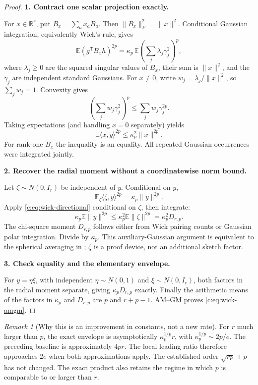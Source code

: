 \documentclass[11pt]{article}
\numberwithin{equation}{section}
\theoremstyle{definition}\newtheorem{definition}[theorem]{Definition}
\theoremstyle{remark}\newtheorem{remark}[theorem]{Remark}
\newcommand{\R}{\mathbb R}\newcommand{\E}{\mathbb E}\newcommand{\Prob}{\mathbb P}
\newcommand{\norm}[1]{\lVert#1\rVert}\newcommand{\ip}[2]{\langle#1,#2\rangle}
\newcommand{\step}[1]{\par\addvspace{.65\baselineskip}\Needspace{4\baselineskip}\noindent\textbf{#1}\par\nobreak\smallskip}
\begin{document}
\begin{proof}
\step{1. Contract one scalar projection exactly.}
For $x\in\R^r$, put $B_x=\sum_a x_a B_a$. Then $\norm{B_x}_F^2=\norm x^2$. Conditional Gaussian integration, equivalently Wick's rule, gives
\[
 \E(g^{\mathsf T}B_xh)^{2p}
 =\kappa_p\,\E\left(\sum_j\lambda_j\gamma_j^2\right)^p,
\]
where $\lambda_j\ge0$ are the squared singular values of $B_x$, their sum is $\norm x^2$, and the $\gamma_j$ are independent standard Gaussians. For $x\ne0$, write $w_j=\lambda_j/\norm x^2$, so $\sum_jw_j=1$.
Convexity gives
\[
 \left(\sum_jw_j\gamma_j^2\right)^p
 \le\sum_jw_j\gamma_j^{2p}.
\]
Taking expectations (and handling $x=0$ separately) yields
\begin{equation}\label{c:eq:wick-directional}
 \E\ip{x}{y}^{2p}\le \kappa_p^2\norm x^{2p}.
\end{equation}
For rank-one $B_x$ the inequality is an equality. All repeated Gaussian occurrences were integrated jointly.

\step{2. Recover the radial moment without a coordinatewise norm bound.}
Let $\zeta\sim N(0,I_r)$ be independent of $y$. Conditional on $y$,
\[
 \E_\zeta\ip{\zeta}{y}^{2p}=\kappa_p\norm y^{2p}.
\]
Apply \eqref{c:eq:wick-directional} conditional on $\zeta$, then integrate:
\[
 \kappa_p\E\norm y^{2p}\le \kappa_p^2\E\norm\zeta^{2p}=\kappa_p^2D_{r,p}.
\]
The chi-square moment $D_{r,p}$ follows either from Wick pairing counts or Gaussian polar integration. Divide by $\kappa_p$. This auxiliary-Gaussian argument is equivalent to the spherical averaging in \cite[projected radial moments]{RMPS}; $\zeta$ is a proof device, not an additional sketch factor.

\step{3. Check equality and the elementary envelope.}
For $y=\eta\xi$, with independent $\eta\sim N(0,1)$ and $\xi\sim N(0,I_r)$, both factors in the radial moment separate, giving $\kappa_pD_{r,p}$ exactly. Finally the arithmetic means of the factors in $\kappa_p$ and $D_{r,p}$ are $p$ and $r+p-1$. AM--GM proves \eqref{c:eq:wick-amgm}.
\end{proof}

\begin{remark}[Why this is an improvement in constants, not a new rate]
For $r$ much larger than $p$, the exact envelope is asymptotically $\kappa_p^{1/p}r$, with $\kappa_p^{1/p}\sim2p/e$. The preceding baseline is approximately $4pr$. The local leading ratio therefore approaches $2e$ when both approximations apply. The established order $\sqrt{rp}+p$ has not changed. The exact product also retains the regime in which $p$ is comparable to or larger than $r$.
\end{remark}
\end{document}
